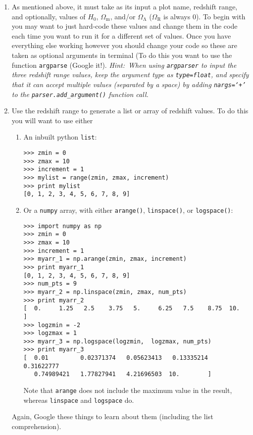 \documentclass[]{article}
\begin{document}
\begin{enumerate}

\item As mentioned above, it must take as its input a plot name, redshift range, and optionally, values of $H_0$, $\Omega_\mathrm{m}$, and/or $\Omega_\mathrm{\Lambda}$ ($\Omega_\mathrm{R}$ is always $0$). To begin with you may want to just hard-code these values and change them in the code each time you want to run it for a different set of values. Once you have everything else working however you should change your code so these are taken as optional arguments in terminal (To do this you want to use the function \texttt{argparse} (Google it!). \itshape{Hint:}\upshape~When using \texttt{argparser} to input the three redshift range values, keep the argument type as \texttt{type=float}, and specify that it can accept multiple values (separated by a space) by adding \texttt{nargs=`+'} to the \texttt{parser.add\_argument()} function call.

\item Use the redshift range to generate a list or array of redshift values. To do this you will want to use either
\begin{enumerate}
\item An inbuilt python \texttt{list}:
\begin{lstlisting}
>>> zmin = 0
>>> zmax = 10
>>> increment = 1
>>> mylist = range(zmin, zmax, increment)
>>> print mylist
[0, 1, 2, 3, 4, 5, 6, 7, 8, 9]
\end{lstlisting}

\item Or a \texttt{numpy} array, with either \texttt{arange()}, \texttt{linspace()}, or \texttt{logspace()}:
\begin{lstlisting}
>>> import numpy as np
>>> zmin = 0
>>> zmax = 10
>>> increment = 1
>>> myarr_1 = np.arange(zmin, zmax, increment)
>>> print myarr_1
[0, 1, 2, 3, 4, 5, 6, 7, 8, 9]
>>> num_pts = 9
>>> myarr_2 = np.linspace(zmin, zmax, num_pts)
>>> print myarr_2
[  0.     1.25   2.5    3.75   5.     6.25   7.5    8.75  10.  ]
>>> logzmin = -2
>>> logzmax = 1
>>> myarr_3 = np.logspace(logzmin,  logzmax, num_pts)
>>> print myarr_3
[  0.01         0.02371374   0.05623413   0.13335214   0.31622777
   0.74989421   1.77827941   4.21696503  10.        ]
\end{lstlisting}
Note that \texttt{arange} does not include the maximum value in the result, whereas \texttt{linspace} and \texttt{logspace} do. 
\end{enumerate}
Again, Google these things to learn about them (including the list comprehension). 


\end{enumerate}
\end{document}
